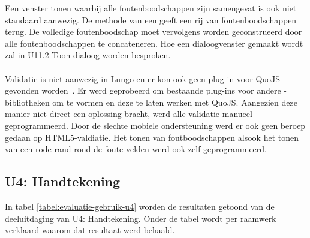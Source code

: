 Een venster tonen waarbij alle foutenboodschappen zijn samengevat is ook niet standaard aanwezig.
De  methode van een  geeft een rij van foutenboodschappen terug.
De volledige foutenboodschap moet vervolgens worden geconstrueerd door alle foutenboodschappen te concateneren.
Hoe een dialoogvenster gemaakt wordt zal in U11.2 Toon dialoog worden besproken.

\paragraph{\lungo}
Validatie is niet aanwezig in Lungo en er kon ook geen plug-in voor QuoJS gevonden worden~\cite{Ameye2013}.
Er werd geprobeerd om bestaande plug-ins voor andere \js{}-bibliotheken om te vormen en deze te laten werken met QuoJS.
Aangezien deze manier niet direct een oplossing bracht, werd alle validatie manueel geprogrammeerd.
Door de slechte mobiele ondersteuning werd er ook geen beroep gedaan op HTML5-valdiatie.
Het tonen van foutboodschappen alsook het tonen van een rode rand rond de foute velden werd ook zelf geprogrammeerd.


\subsection{U4: Handtekening}
In tabel \ref{tabel:evaluatie-gebruik-u4} worden de resultaten getoond van de deeluitdaging van U4: Handtekening.
Onder de tabel wordt per raamwerk verklaard waarom dat resultaat werd behaald.

\begin{table}[H]
\centering
{}
\caption{Gebruik voor U4: Handtekening}
\label{tabel:evaluatie-gebruik-u4}
\end{table}

